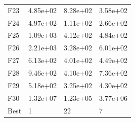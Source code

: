 \begin{table}[H]
\begin{minipage}{.5\linewidth}
\begin{tabular}{llll}
        F23  &  4.85e+02 &  8.28e+02 &  3.58e+02 \\
        F24  &  4.97e+02 &  1.11e+02 &  2.66e+02 \\
        F25  &  1.09e+03 &  4.12e+02 &  4.84e+02 \\
        F26  &  2.21e+03 &  3.28e+02 &  6.01e+02 \\
        F27  &  6.13e+02 &  4.01e+02 &  4.49e+02 \\
        F28  &  9.46e+02 &  4.10e+02 &  7.36e+02 \\
        F29  &  5.18e+02 &  3.25e+02 &  4.30e+02 \\
        F30  &  1.32e+07 &  1.23e+05 &  3.77e+06 \\
        Best &         1 &        22 &         7 \\
        \bottomrule
        \end{tabular}
        

\end{minipage}
\end{table}
